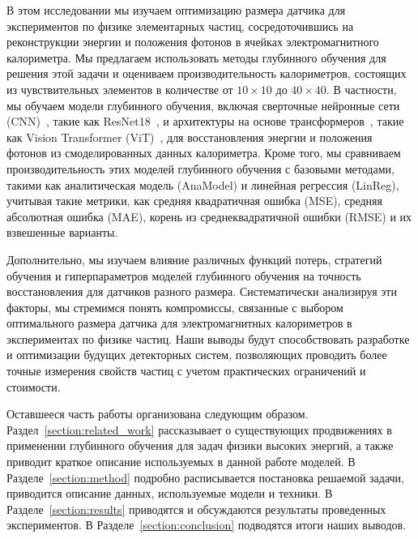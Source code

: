 \documentclass[a4paper,12pt]{extarticle}
\begin{document}

В этом исследовании мы изучаем оптимизацию размера датчика для экспериментов по физике элементарных частиц, сосредоточившись на реконструкции энергии и положения фотонов в ячейках электромагнитного калориметра. Мы предлагаем использовать методы глубинного обучения для решения этой задачи и оцениваем производительность калориметров, состоящих из чувствительных элементов в количестве от $10 \times 10$ до $40 \times 40$. В частности, мы обучаем модели глубинного обучения, включая сверточные нейронные сети (CNN)~\cite{oshea2015introduction}, такие как ResNet18~\cite{he2015deep}, и архитектуры на основе трансформеров~\cite{vaswani2023attention}, такие как Vision Transformer (ViT)~\cite{dosovitskiy2021image}, для восстановления энергии и положения фотонов из смоделированных данных калориметра. Кроме того, мы сравниваем производительность этих моделей глубинного обучения с базовыми методами, такими как аналитическая модель (AnaModel) и линейная регрессия (LinReg), учитывая такие метрики, как средняя квадратичная ошибка (MSE), средняя абсолютная ошибка (MAE), корень из среднеквадратичной ошибки (RMSE) и их взвешенные варианты.

Дополнительно, мы изучаем влияние различных функций потерь, стратегий обучения и гиперпараметров моделей глубинного обучения на точность восстановления для датчиков разного размера. Систематически анализируя эти факторы, мы стремимся понять компромиссы, связанные с выбором оптимального размера датчика для электромагнитных калориметров в экспериментах по физике частиц. Наши выводы будут способствовать разработке и оптимизации будущих детекторных систем, позволяющих проводить более точные измерения свойств частиц с учетом практических ограничений и стоимости.

Оставшееся часть работы организована следующим образом. Раздел~\ref{section:related_work} рассказывает о существующих продвижениях в применении глубинного обучения для задач физики высоких энергий, а также приводит краткое описание используемых в данной работе моделей. В Разделе~\ref{section:method} подробно расписывается постановка решаемой задачи, приводится описание данных, используемые модели и техники. В Разделе~\ref{section:results} приводятся и обсуждаются результаты проведенных экспериментов. В Разделе~\ref{section:conclusion} подводятся итоги наших выводов.
\end{document}
